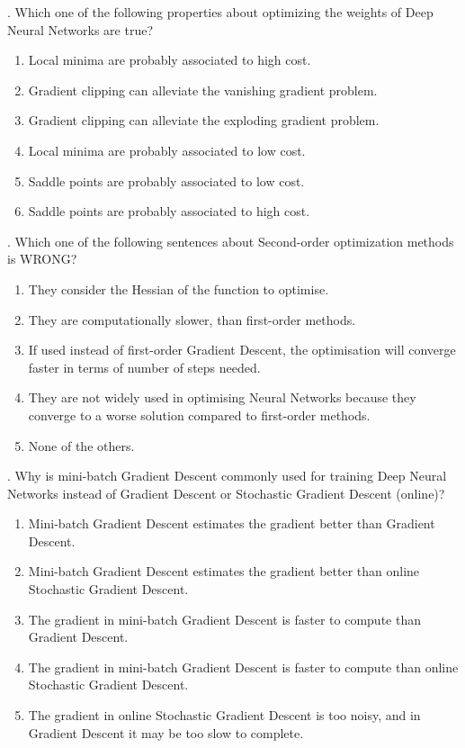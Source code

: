 . Which one of the following properties about optimizing the weights of Deep Neural Networks are true?

\begin{enumerate}[label=\roman*]
    \item Local minima are probably associated to high cost.
    \item Gradient clipping can alleviate the vanishing gradient problem.
    \item Gradient clipping can alleviate the exploding gradient problem.
    \item Local minima are probably associated to low cost.
    \item Saddle points are probably associated to low cost.
    \item Saddle points are probably associated to high cost.
\end{enumerate}

. Which one of the following sentences about Second-order optimization methods is WRONG?

\begin{enumerate}[label=\roman*]
    \item They consider the Hessian of the function to optimise.
    \item They are computationally slower, than first-order methods.
    \item If used instead of first-order Gradient Descent, the optimisation will converge faster in terms of number of steps needed.
    \item They are not widely used in optimising Neural Networks because they converge to a worse solution compared to first-order methods.
    \item None of the others.
\end{enumerate}

. Why is mini-batch Gradient Descent commonly used for training Deep Neural Networks instead of Gradient Descent or Stochastic Gradient Descent (online)?

\begin{enumerate}[label=\roman*]
    \item Mini-batch Gradient Descent estimates the gradient better than Gradient Descent.
    \item Mini-batch Gradient Descent estimates the gradient better than online Stochastic Gradient Descent.
    \item The gradient in mini-batch Gradient Descent is faster to compute than Gradient Descent.
    \item The gradient in mini-batch Gradient Descent is faster to compute than online Stochastic Gradient Descent.
    \item The gradient in online Stochastic Gradient Descent is too noisy, and in Gradient Descent it may be too slow to complete.

\end{enumerate}


